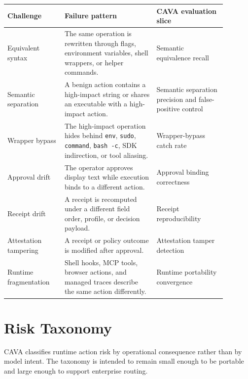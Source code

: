\documentclass[11pt]{article}
\begin{document}
\begin{longtable}{@{}L{0.23\linewidth}L{0.37\linewidth}L{0.28\linewidth}@{}}
\toprule
Challenge & Failure pattern & CAVA evaluation slice \\
\midrule
Equivalent syntax & The same operation is rewritten through flags, environment variables, shell wrappers, or helper commands. & Semantic equivalence recall \\
Semantic separation & A benign action contains a high-impact string or shares an executable with a high-impact action. & Semantic separation precision and false-positive control \\
Wrapper bypass & The high-impact operation hides behind \texttt{env}, \texttt{sudo}, \texttt{command}, \texttt{bash -c}, SDK indirection, or tool aliasing. & Wrapper-bypass catch rate \\
Approval drift & The operator approves display text while execution binds to a different action. & Approval binding correctness \\
Receipt drift & A receipt is recomputed under a different field order, profile, or decision payload. & Receipt reproducibility \\
Attestation tampering & A receipt or policy outcome is modified after approval. & Attestation tamper detection \\
Runtime fragmentation & Shell hooks, MCP tools, browser actions, and managed traces describe the same action differently. & Runtime portability convergence \\
\bottomrule
\end{longtable}

\section{Risk Taxonomy}

CAVA classifies runtime action risk by operational consequence rather than by model intent. The taxonomy is intended to remain small enough to be portable and large enough to support enterprise routing.
\end{document}
